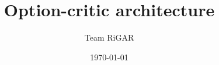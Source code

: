 \title{Option-critic architecture}
\author{Team RiGAR}
\date{\today}

\makeatletter
\def\maketitle{
    \begin{center}
        {\LARGE \bfseries \@title~\\[1ex]}
        {\large \@author~\\[1ex]}
        {\@date}
    \end{center}
}
\makeatother
\maketitle
